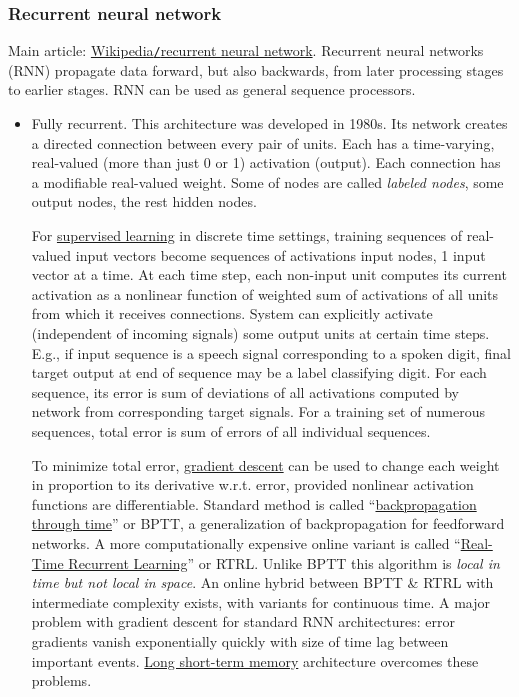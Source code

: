 \documentclass{article}
\begin{document}
\subsubsection{Recurrent neural network}
Main article: \href{https://en.wikipedia.org/wiki/Recurrent_neural_network}{Wikipedia{\tt/}recurrent neural network}. Recurrent neural networks (RNN) propagate data forward, but also backwards, from later processing stages to earlier stages. RNN can be used as general sequence processors.
\begin{itemize}
	\item {\sf Fully recurrent.} This architecture was developed in 1980s. Its network creates a directed connection between every pair of units. Each has a time-varying, real-valued (more than just 0 or 1) activation (output). Each connection has a modifiable real-valued weight. Some of nodes are called {\it labeled nodes}, some output nodes, the rest hidden nodes.
	
	For \href{https://en.wikipedia.org/wiki/Supervised_learning}{supervised learning} in discrete time settings, training sequences of real-valued input vectors become sequences of activations input nodes, 1 input vector at a time. At each time step, each non-input unit computes its current activation as a nonlinear function of weighted sum of activations of all units from which it receives connections. System can explicitly activate (independent of incoming signals) some output units at certain time steps. E.g., if input sequence is a speech signal corresponding to a spoken digit, final target output at end of sequence may be a label classifying digit. For each sequence, its error is sum of deviations of all activations computed by network from corresponding target signals. For a training set of numerous sequences, total error is sum of errors of all individual sequences.
	
	To minimize total error, \href{https://en.wikipedia.org/wiki/Gradient_descent}{gradient descent} can be used to change each weight in proportion to its derivative w.r.t. error, provided nonlinear activation functions are differentiable. Standard method is called ``\href{https://en.wikipedia.org/wiki/Backpropagation_through_time}{backpropagation through time}'' or BPTT, a generalization of backpropagation for feedforward networks. A more computationally expensive online variant is called ``\href{https://en.wikipedia.org/wiki/Real-Time_Recurrent_Learning}{Real-Time Recurrent Learning}'' or RTRL. Unlike BPTT this algorithm is {\it local in time but not local in space}. An online hybrid between BPTT \& RTRL with intermediate complexity exists, with variants for continuous time. A major problem with gradient descent for standard RNN architectures: error gradients vanish exponentially quickly with size of time lag between important events. \href{https://en.wikipedia.org/wiki/Long_short-term_memory}{Long short-term memory} architecture overcomes these problems.
	

\end{itemize}
\end{document}
